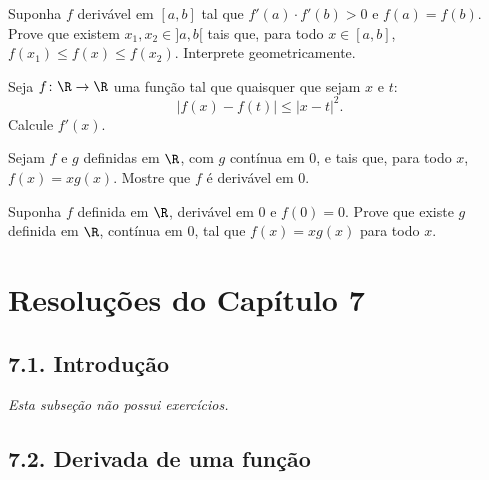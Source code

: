 \begin{exercicio}[46]
\label{ex:7.17.46}
Suponha $f$ derivável em $[a, b]$ tal que $f'(a) \cdot f'(b) > 0$ e $f(a) = f(b)$. Prove que existem $x_1, x_2 \in {]a, b[}$ tais que, para todo $x \in [a, b]$, $f(x_1) \le f(x) \le f(x_2)$. Interprete geometricamente.
\end{exercicio}

\begin{exercicio}[47]
\label{ex:7.17.47}
Seja $f\colon \R \to \R$ uma função tal que quaisquer que sejam $x$ e $t$:
\[
|f(x) - f(t)| \le |x - t|^2.
\]
Calcule $f'(x)$.
\end{exercicio}

\begin{exercicio}[48]
\label{ex:7.17.48}
Sejam $f$ e $g$ definidas em $\R$, com $g$ contínua em 0, e tais que, para todo $x$, $f(x) = xg(x)$. Mostre que $f$ é derivável em 0.
\end{exercicio}

\begin{exercicio}[49]
\label{ex:7.17.49}
Suponha $f$ definida em $\R$, derivável em 0 e $f(0) = 0$. Prove que existe $g$ definida em $\R$, contínua em 0, tal que $f(x) = xg(x)$ para todo $x$.
\end{exercicio}


\clearpage
\section*{Resoluções do Capítulo 7}

\subsection*{7.1. Introdução}
\textit{Esta subseção não possui exercícios.}

\subsection*{7.2. Derivada de uma função}

